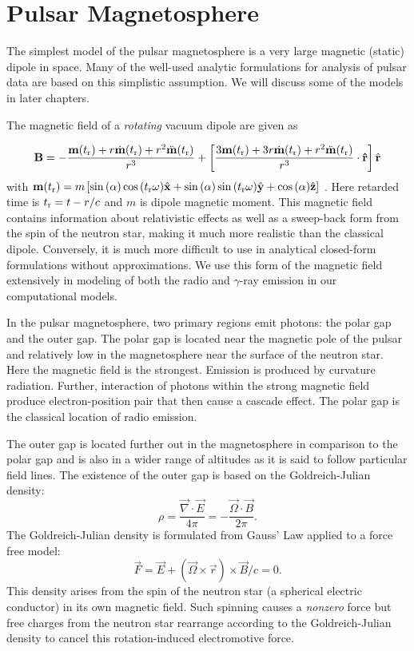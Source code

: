 \section{Pulsar Magnetosphere}
\label{sec:pulsarMag}
The simplest model of the pulsar magnetosphere is
a very large magnetic (static) dipole in space.  Many of 
the well-used analytic formulations for analysis of pulsar
data are based on this simplistic assumption. 
We will discuss some of the models in later chapters.

The magnetic field of a \textit{rotating} vacuum dipole are given as

\begin{equation}
\label{eq:magField}
\vec{B}=-\frac{ \vec{m}(t_{\rm r}) +r\dot{\vec{m}}(t_{\rm r}) + r^2\ddot{\vec{m}}(t_{\rm r})}{r^3} + \left[ \frac{ 3\vec{m}(t_{\rm r}) +3r\dot{\vec{m}}(t_{\rm r}) + r^2\ddot{\vec{m}}(t_{\rm r})}{r^3} \cdot \mathbf{\hat{r}} \right] \hat{r}
\end{equation}
with
$\vec{m}(t_{\rm r})=m\left[\sin{(\alpha)} \cos{(t_{\rm r} \omega)} \hat{x}+ \sin{(\alpha)} \sin{(t_{\rm r} \omega)} \hat{y} +\cos{(\alpha)} \hat{z}\right]$
\citep{kaburaki1980determination}.
Here retarded time is $t_{\rm r}=t-r/c$
and $m$ is dipole magnetic moment.
This magnetic field contains information about relativistic effects
as well as a sweep-back form from the spin of the neutron star, making
it much more realistic than the classical dipole.  Conversely, it is much more difficult
to use in analytical closed-form formulations without approximations.
We use this form of the magnetic field extensively in modeling
of both the radio and $\gamma$-ray emission in our computational 
models.

In the pulsar magnetosphere, two primary regions emit photons: the polar gap
and the outer gap.  The polar gap is located near the magnetic pole of the pulsar
and relatively low in the magnetosphere near the surface of the neutron star.
Here the magnetic field is the strongest.   Emission is produced by curvature 
radiation.  Further, interaction of photons within the strong magnetic field
produce electron-position pair that then cause a cascade effect.  The
polar gap is the classical location of radio emission.

The outer gap is located further out in the magnetosphere in comparison to 
the polar gap and is also in a wider range of altitudes as it is said
to follow particular field lines.  The existence of the outer gap
is based on the Goldreich-Julian density: 
\begin{equation}\rho=\frac{\vec{\nabla}\cdot \vec{E}}{4\pi}=-\frac{\vec{\Omega}\cdot \vec{B}}{2\pi}.\end{equation}
The Goldreich-Julian density is formulated from Gauss' Law applied
to a force free model:
\begin{equation}\vec{F}=\vec{E}+(\vec{\Omega}\times \vec{r})\times \vec{B}/c=0.\end{equation}
This density arises from the spin of the neutron star 
(a spherical electric conductor) in  
its own magnetic field. Such spinning causes a \textit{nonzero}
force but free charges from the neutron star rearrange
according to the Goldreich-Julian density
to cancel this rotation-induced electromotive force.


